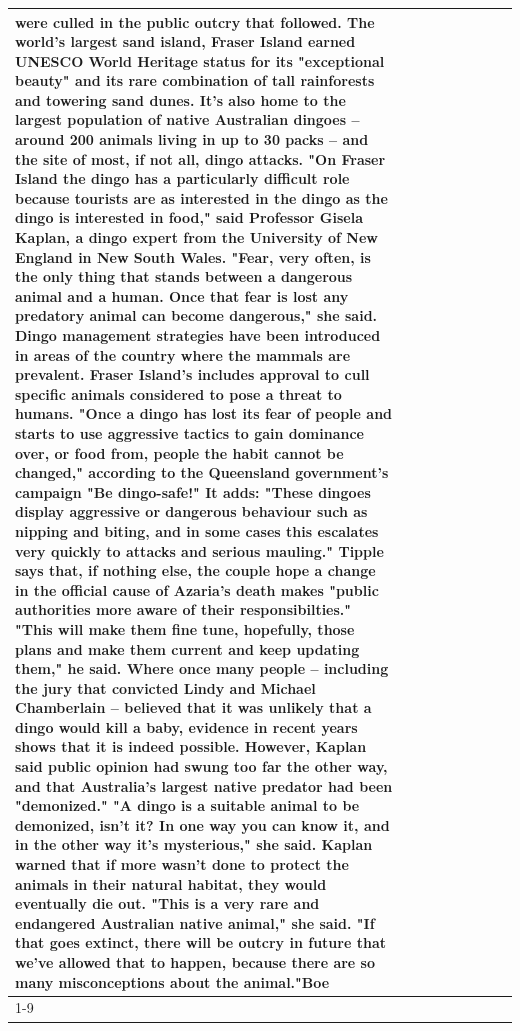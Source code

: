 \begin{table}[H]
\begin{tabular}{lllrlllll}
were culled in the public outcry that followed. The world's largest sand island, Fraser Island earned UNESCO World Heritage status for its "exceptional beauty" and its rare combination of tall rainforests and towering sand dunes. It's also home to the largest population of native Australian dingoes -- around 200 animals living in up to 30 packs -- and the site of most, if not all, dingo attacks. "On Fraser Island the dingo has a particularly difficult role because tourists are as interested in the dingo as the dingo is interested in food," said Professor Gisela Kaplan, a dingo expert from the University of New England in New South Wales. "Fear, very often, is the only thing that stands between a dangerous animal and a human. Once that fear is lost any predatory animal can become dangerous," she said. Dingo management strategies have been introduced in areas of the country where the mammals are prevalent. Fraser Island's includes approval to cull specific animals considered to pose a threat to humans. "Once a dingo has lost its fear of people and starts to use aggressive tactics to gain dominance over, or food from, people the habit cannot be changed," according to the Queensland government's campaign "Be dingo-safe!" It adds: "These dingoes display aggressive or dangerous behaviour such as nipping and biting, and in some cases this escalates very quickly to attacks and serious mauling." Tipple says that, if nothing else, the couple hope a change in the official cause of Azaria's death makes "public authorities more aware of their responsibilties." "This will make them fine tune, hopefully, those plans and make them current and keep updating them," he said. Where once many people -- including the jury that convicted Lindy and Michael Chamberlain -- believed that it was unlikely that a dingo would kill a baby, evidence in recent years shows that it is indeed possible. However, Kaplan said public opinion had swung too far the other way, and that Australia's largest native predator had been "demonized." "A dingo is a suitable animal to be demonized, isn't it? In one way you can know it, and in the other way it's mysterious," she said. Kaplan warned that if more wasn't done to protect the animals in their natural habitat, they would eventually die out. "This is a very rare and endangered Australian native animal," she said. "If that goes extinct, there will be outcry in future that we've allowed that to happen, because there are so many misconceptions about the animal."Boe \\
\cline{1-9}

\end{tabular}
\end{table}
